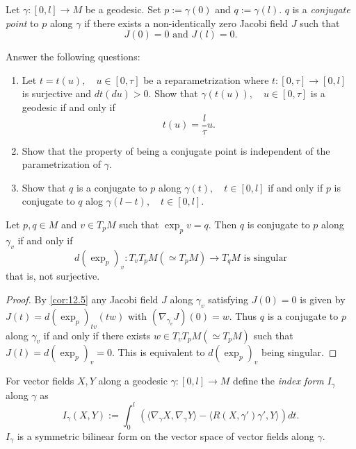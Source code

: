 \begin{definition}\label{def:12.6}
Let $\gamma : [0,l] \to M$ be a geodesic.
Set $p:= \gamma(0)$ and $q:= \gamma(l)$.
$q$ is a \emph{conjugate point} to $p$ along $\gamma$ if 
there exists a non-identically zero Jacobi field $J$ such that
\[
J(0) = 0 \text{ and } J(l) = 0.
\]
\end{definition}

\begin{problem}\label{prob:19}
Answer the following questions:
\begin{enumerate}[label=(\arabic*), ref=Problem \theproblem~(\arabic*)]
\item Let $t=t(u), \quad u \in [0,\tau]$ be a reparametrization where $t: [0,\tau] \to [0,l]$ is surjective and $dt(du) > 0$.
Show that $\gamma(t(u)), \quad u \in [0,\tau]$ is a geodesic if and only if
\[
t(u) = \frac{l}{\tau}u.
\]
\item Show that the property of being a conjugate point is independent of the parametrization of $\gamma$.
\item Show that $q$ is a conjugate to $p$ along $\gamma(t), \quad t \in [0,l]$ if and only if
$p$ is conjugate to $q$ alog $\gamma(l-t), \quad t\in [0,l]$.
\end{enumerate}
\end{problem}

\begin{proposition}\label{12.7}
Let $p,q \in M$ and $v \in T_pM$ such that $\exp_pv = q$.
Then $q$ is conjugate to $p$ along $\gamma_v$ if and only if
\[
d(\exp_p)_v : T_vT_pM(\simeq T_pM) \to T_qM \text{ is singular}
\]
that is, not surjective.
\end{proposition}

\begin{proof}
By \autoref{cor:12.5} any Jacobi field $J$ along $\gamma_v$ satisfying
$J(0) = 0$ is given by $J(t) = d(\exp_p)_{tv}(tw)$ with $(\nabla_{\gamma_v}J)(0) = w$.
Thus $q$ is a conjugate to $p$ along $\gamma_v$ if and only if
there exists $w \in T_vT_pM(\simeq T_pM)$ such that $J(l) = d(\exp_p)_v = 0$.
This is equivalent to $d(\exp_p)_v$ being singular.
\end{proof}

\begin{definition}\label{def:12.8}
For vector fields $X,Y$ along a geodesic $\gamma:[0,l] \to M$ define the \emph{index form}
$I_{\gamma}$ along $\gamma$ as
\[
I_{\gamma}(X,Y) := \int_0^l\left(\langle \nabla_{\gamma}X, \nabla_{\gamma}Y\rangle - \langle R(X,\gamma')\gamma',Y\rangle\right)dt.
\]
$I_{\gamma}$ is a symmetric bilinear form on the vector space of vector fields along $\gamma$.
\end{definition}

